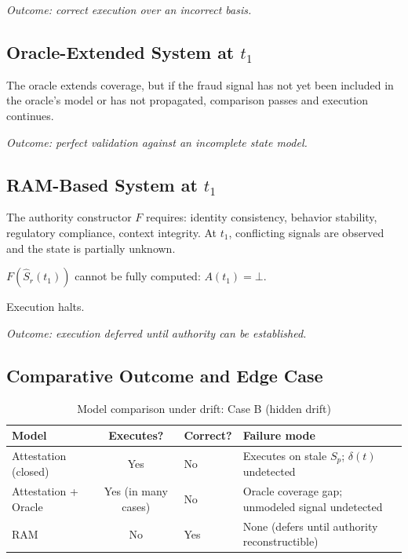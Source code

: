 \documentclass[11pt]{article}
\newcommand{\Sp}{S_p}
\newcommand{\Ndefval}{\bot}
\begin{document}
\begin{center}
\textit{Outcome: correct execution over an incorrect basis.}
\end{center}

\subsection{Oracle-Extended System at $t_1$}

The oracle extends coverage, but if the fraud signal has not yet been included
in the oracle's model or has not propagated, comparison passes and execution
continues.

\begin{center}
\textit{Outcome: perfect validation against an incomplete state model.}
\end{center}

\subsection{RAM-Based System at $t_1$}

The authority constructor $F$ requires: identity consistency, behavior
stability, regulatory compliance, context integrity.
At $t_1$, conflicting signals are observed and the state is partially unknown.

$F(\hat{S}_r(t_1))$ cannot be fully computed: $A(t_1) = \Ndefval$.

Execution halts.

\begin{center}
\textit{Outcome: execution deferred until authority can be established.}
\end{center}

\subsection{Comparative Outcome and Edge Case}

\begin{table}[H]
\centering
\caption{Model comparison under drift: Case B (hidden drift)}
\begin{tabular}{lclp{5.5cm}}
\toprule
\textbf{Model} & \textbf{Executes?} & \textbf{Correct?} & \textbf{Failure mode} \\
\midrule
Attestation (closed) & Yes & No & Executes on stale $\Sp$; $\delta(t)$ undetected \\
Attestation + Oracle & Yes (in many cases) & No & Oracle coverage gap; unmodeled signal undetected \\
RAM                  & No  & Yes & None (defers until authority reconstructible) \\
\bottomrule
\end{tabular}
\end{table}
\end{document}
